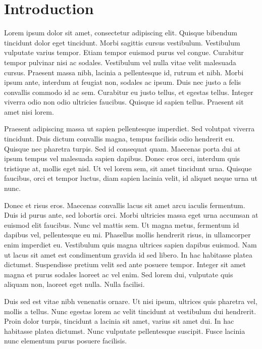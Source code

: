 \documentclass[12pt]{report}
\begin{document}
\normalem       %


\chapter{Introduction}\label{chap:introduction} 
Lorem ipsum dolor sit amet, consectetur adipiscing elit. Quisque bibendum tincidunt dolor eget tincidunt. Morbi sagittis cursus vestibulum. Vestibulum vulputate varius tempor. Etiam tempor euismod purus vel congue. Curabitur tempor pulvinar nisi ac sodales. Vestibulum vel nulla vitae velit malesuada cursus. Praesent massa nibh, lacinia a pellentesque id, rutrum et nibh. Morbi ipsum ante, interdum at feugiat non, sodales ac ipsum. Duis nec justo a felis convallis commodo id ac sem. Curabitur eu justo tellus, et egestas tellus. Integer viverra odio non odio ultricies faucibus. Quisque id sapien tellus. Praesent sit amet nisi lorem.

Praesent adipiscing massa ut sapien pellentesque imperdiet. Sed volutpat viverra tincidunt. Duis dictum convallis magna, tempus facilisis odio hendrerit eu. Quisque nec pharetra turpis. Sed id consequat quam. Maecenas porta dui at ipsum tempus vel malesuada sapien dapibus. Donec eros orci, interdum quis tristique at, mollis eget nisl. Ut vel lorem sem, sit amet tincidunt urna. Quisque faucibus, orci et tempor luctus, diam sapien lacinia velit, id aliquet neque urna ut nunc.

Donec et risus eros. Maecenas convallis lacus sit amet arcu iaculis fermentum. Duis id purus ante, sed lobortis orci. Morbi ultricies massa eget urna accumsan at euismod elit faucibus. Nunc vel mattis sem. Ut magna metus, fermentum id dapibus vel, pellentesque eu mi. Phasellus mollis hendrerit risus, in ullamcorper enim imperdiet eu. Vestibulum quis magna ultrices sapien dapibus euismod. Nam ut lacus sit amet est condimentum gravida id sed libero. In hac habitasse platea dictumst. Suspendisse pretium velit sed ante posuere tempor. Integer sit amet magna et purus sodales laoreet ac vel enim. Sed lorem dui, vulputate quis aliquam non, laoreet eget nulla. Nulla facilisi.

Duis sed est vitae nibh venenatis ornare. Ut nisi ipsum, ultrices quis pharetra vel, mollis a tellus. Nunc egestas lorem ac velit tincidunt at vestibulum dui hendrerit. Proin dolor turpis, tincidunt a lacinia sit amet, varius sit amet dui. In hac habitasse platea dictumst. Nunc vulputate pellentesque suscipit. Fusce lacinia nunc elementum purus posuere facilisis.
\end{document}
